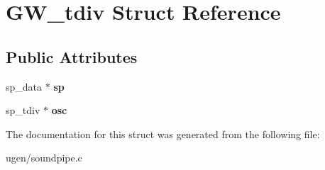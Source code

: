 \hypertarget{structGW__tdiv}{}\section{G\+W\+\_\+tdiv Struct Reference}
\label{structGW__tdiv}
\subsection*{Public Attributes}
\begin{DoxyCompactItemize}
\item 
\hypertarget{structGW__tdiv_a7ba1485d730107fc50f2befa7dca1401}{}\label{structGW__tdiv_a7ba1485d730107fc50f2befa7dca1401} 
sp\+\_\+data $\ast$ {\bfseries sp}
\item 
\hypertarget{structGW__tdiv_afc54ec84aa72c217b549ec81faec4578}{}\label{structGW__tdiv_afc54ec84aa72c217b549ec81faec4578} 
sp\+\_\+tdiv $\ast$ {\bfseries osc}
\end{DoxyCompactItemize}


The documentation for this struct was generated from the following file\+:\begin{DoxyCompactItemize}
\item 
ugen/soundpipe.\+c\end{DoxyCompactItemize}
